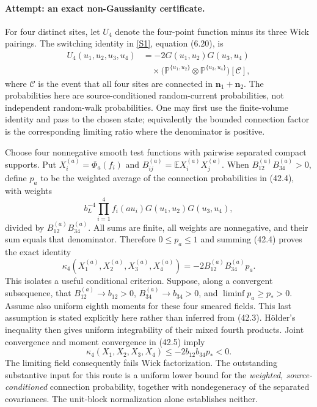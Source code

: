 \documentclass[11pt,a4paper]{article}
\newcommand{\E}{\mathbb{E}}
\newcommand{\sref}[2]{\hyperlink{source:#1:#2}{[S#2]}}
\numberwithin{equation}{section}
\begin{document}
\paragraph{Attempt: an exact non-Gaussianity certificate.}
For four distinct sites, let $U_4$ denote the four-point function minus its
three Wick pairings. The switching identity in \sref{42}{1}, equation
(6.20), is
\[
 \begin{aligned}
 U_4(u_1,u_2,u_3,u_4)
 &=-2G(u_1,u_2)G(u_3,u_4)\\
 &\quad\times
 \bigl(\mathbb P^{\{u_1,u_2\}}\!\otimes
   \mathbb P^{\{u_3,u_4\}}\bigr)[\mathcal C],
 \end{aligned}
 \tag{42.4}
\]
where $\mathcal C$ is the event that all four sites are connected in
$\mathbf n_1+\mathbf n_2$. The probabilities here are source-conditioned random-current probabilities,
not independent random-walk probabilities. One may first use the finite-volume
identity and pass to the chosen state; equivalently the bounded connection
factor is the corresponding limiting ratio where the denominator is positive.

Choose four nonnegative smooth test functions with pairwise separated
compact supports. Put $X_i^{(a)}=\Phi_a(f_i)$ and
$B_{ij}^{(a)}=\E X_i^{(a)}X_j^{(a)}$. When
$B_{12}^{(a)}B_{34}^{(a)}>0$, define $p_a$ to be the weighted average of the
connection probabilities in (42.4), with weights
\[
 b_L^{-4}\prod_{i=1}^4 f_i(au_i)G(u_1,u_2)G(u_3,u_4),
\]
divided by $B_{12}^{(a)}B_{34}^{(a)}$. All sums are finite, all weights are
nonnegative, and their sum equals that denominator. Therefore $0\le p_a\le1$
and summing (42.4) proves the exact identity
\[
 \kappa_4(X_1^{(a)},X_2^{(a)},X_3^{(a)},X_4^{(a)})
       =-2B_{12}^{(a)}B_{34}^{(a)}p_a. \tag{42.5}
\]
This isolates a useful conditional criterion. Suppose, along a convergent
subsequence, that $B_{12}^{(a)}\to b_{12}>0$,
$B_{34}^{(a)}\to b_{34}>0$, and $\liminf p_a\ge p_*>0$.
Assume also uniform eighth moments for these four smeared fields. This last
assumption is stated explicitly here rather than inferred from (42.3).
H\"older's inequality then gives uniform integrability of their mixed
fourth products. Joint convergence and moment convergence in (42.5) imply
\[
 \kappa_4(X_1,X_2,X_3,X_4)\le-2b_{12}b_{34}p_*<0.
 \tag{42.6}
\]
The limiting field consequently fails Wick factorization. The outstanding
substantive input for this route is a uniform lower bound for the
\emph{weighted, source-conditioned} connection probability, together with
nondegeneracy of the separated covariances. The unit-block normalization
alone establishes neither.
\end{document}
